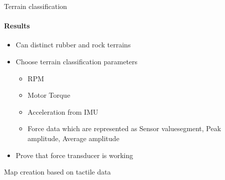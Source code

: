 \documentclass[aspectratio=169]{beamer}
\begin{document}
\begin{frame}[t]{Terrain classification}
    \framesubtitle{Results}
    \Large
    \begin{itemize}
        \item Can distinct rubber and rock terrains
        \item Choose terrain classification parameters
              \begin{itemize}
                  \item RPM
                  \item Motor Torque
                  \item Acceleration from IMU
                  \item Force data which are represented as Sensor value\/segment, Peak amplitude, Average amplitude
              \end{itemize}
        \item Prove that force transducer is working
    \end{itemize}
\end{frame}

\begin{frame}[t]{Map creation based on tactile data}
    \framesubtitle{}
\end{frame}
\end{document}
